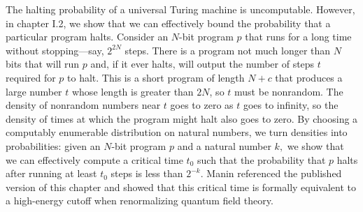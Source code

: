 \documentclass[12pt,twoside,openright]{report}
\begin{document}
The halting probability of a universal Turing machine is uncomputable.  However, in chapter I.2, we show that we can effectively bound the probability that a particular program halts.  Consider an $N$-bit program $p$ that runs for a long time without stopping---say, $2^{2N}$ steps.  There is a program not much longer than $N$ bits that will run $p$ and, if it ever halts, will output the number of steps $t$ required for $p$ to halt.  This is a short program of length $N + c$ that produces a large number $t$ whose length is greater than $2N$, so $t$ must be nonrandom.  The density of nonrandom numbers near $t$ goes to zero as $t$ goes to infinity, so the density of times at which the program might halt also goes to zero.  By choosing a computably enumerable distribution on natural numbers, we turn densities into probabilities: given an $N$-bit program $p$ and a natural number $k,$ we show that we can effectively compute a critical time $t_0$ such that the probability that $p$ halts after running at least $t_0$ steps is less than $2^{-k}.$  Manin \cite{ManinRenorm2} referenced the published version of this chapter and showed that this critical time is formally equivalent to a high-energy cutoff when renormalizing quantum field theory.
\end{document}
